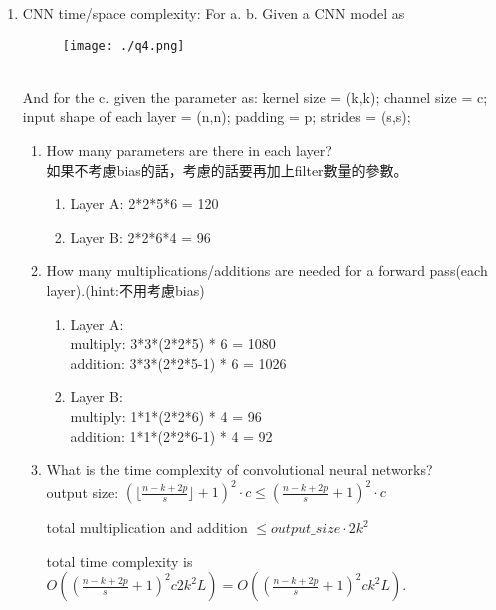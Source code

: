 \documentclass[12pt, a4paper]{article}
\begin{document}
\begin{enumerate}
\item CNN time/space complexity: For a. b. Given a CNN model as
\begin{figure}[h]
    \centering
    \texttt{[image: ./q4.png]}
\end{figure}\\
And for the c. given the parameter as:
kernel size = (k,k);
channel size = c;
input shape of each layer = (n,n);
padding = p;
strides = (s,s);
\begin{enumerate}
    \item How many parameters are there in each layer?\\
    如果不考慮bias的話，考慮的話要再加上filter數量的參數。
    \begin{enumerate}
        \item Layer A: 2*2*5*6  = 120
        \item Layer B: 2*2*6*4  = 96
    \end{enumerate}
    \item How many multiplications/additions are needed for a forward pass(each layer).(hint:不用考慮bias)\\
    \begin{enumerate}
        \item Layer A: \\
        multiply: 3*3*(2*2*5) * 6 = 1080\\
        addition: 3*3*(2*2*5-1) * 6 = 1026\\
        \item Layer B: \\
        multiply: 1*1*(2*2*6) * 4 = 96\\
        addition: 1*1*(2*2*6-1) * 4 = 92\\
    \end{enumerate}
    \item What is the time complexity of convolutional neural networks?\\
    output size: $(\lfloor\frac{n-k+2p}{s}\rfloor + 1)^2\cdot c \leq (\frac{n-k+2p}{s}+1)^2\cdot c$\par
    total multiplication and addition $\leq output\_size \cdot 2k^2$\par
    total time complexity is $O((\frac{n-k+2p}{s}+1)^2 c 2k^2 L) = O((\frac{n-k+2p}{s}+1)^2 c k^2 L)$.
    \iffalse
        1 + s*(time-1) + k-1 >= n, 1 + s*(time-2) + k-1 < n
        (n-k) / s + 2 > time >= (n-k) / s + 1
        time = upper((n-k)/s) + 1
        add padding:
        time = upper((n-k+2p)/s) + 1
    \fi
\end{enumerate}


\end{enumerate}
\end{document}

